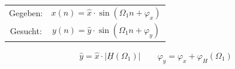 \begin{tabular}{cc}
	Gegeben: & $x(n) = \hat{x} \cdot \sin(\Omega_1n+\varphi_x)$\\
	Gesucht: & $y(n) = \hat{y} \cdot \sin(\Omega_1n+\varphi_y)$
\end{tabular}
\begin{gather*}
\boxed{
\hat{y} = \hat{x} \cdot |\underline{H}(\Omega_1)|} \qquad
\boxed{
 \varphi_y = \varphi_x + \varphi_H(\Omega_1) } 
\end{gather*}




